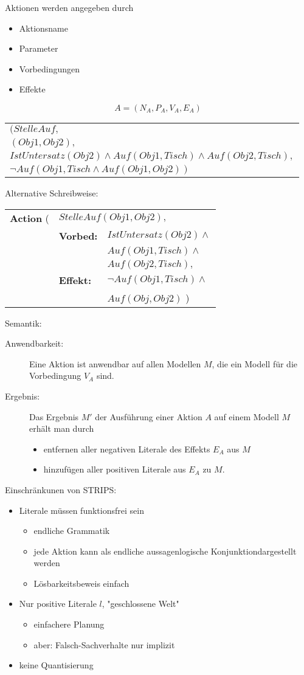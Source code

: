 Aktionen werden angegeben durch
\begin{itemize}
\item Aktionsname
\item Parameter
\item Vorbedingungen
\item Effekte
\end{itemize}
$$A = (N_A,P_A,V_A,E_A)$$
\begin{center}
\begin{tabular}{l}
$(StelleAuf,$ \\ $(Obj1,Obj2),$ \\ $IstUntersatz(Obj2) \wedge Auf(Obj1,Tisch) \wedge Auf(Obj2,Tisch),$ \\ $\neg Auf(Obj1,Tisch \wedge Auf(Obj1,Obj2))$
\end{tabular}
\end{center}
Alternative Schreibweise:
\begin{center}
\begin{tabular}{lll}
\textbf{Action} ( & \multicolumn{2}{l}{$StelleAuf(Obj1, Obj2),$} \\
& \textbf{Vorbed:} & $IstUntersatz(Obj2) \wedge$ \\ && $Auf(Obj1, Tisch) \wedge$ \\ && $Auf(Obj2, Tisch),$ \\
& \textbf{Effekt:} & $\neg Auf(Obj1, Tisch) \wedge$ \\ && $Auf(Obj, Obj2)$ \qquad \quad )
\end{tabular}
\end{center}
Semantik:
\begin{description}
\item[Anwendbarkeit:] Eine Aktion ist anwendbar auf allen Modellen $M$, die ein Modell für die Vorbedingung $V_A$ sind.
\item[Ergebnis:] Das Ergebnis $M'$ der Ausführung einer Aktion $A$ auf einem Modell $M$ erhält man durch
\begin{itemize}
\item entfernen aller negativen Literale des Effekts $E_A$ aus $M$
\item hinzufügen aller positiven Literale aus $E_A$ zu $M$.
\end{itemize}
\end{description}
Einschränkunen von STRIPS:
\begin{itemize}
\item Literale müssen funktionsfrei sein
\begin{itemize}
\item endliche Grammatik
\item jede Aktion kann als endliche aussagenlogische Konjunktiondargestellt werden
\item Lösbarkeitsbeweis einfach
\end{itemize}
\item Nur positive Literale $l$, "{}geschlossene Welt"{}
\begin{itemize}
\item einfachere Planung
\item aber: Falsch-Sachverhalte nur implizit
\end{itemize}
\item keine Quantisierung
\end{itemize}
